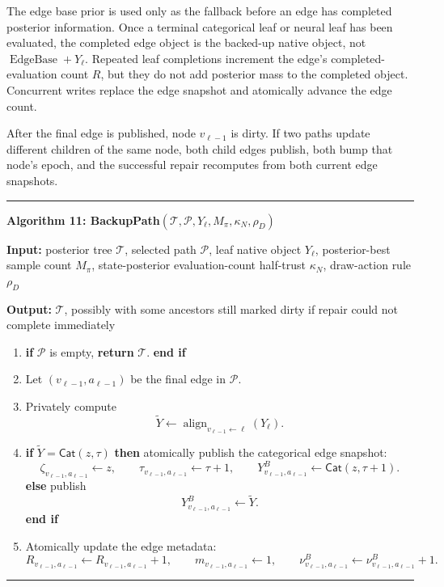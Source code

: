 \documentclass[11pt]{article}
\newcommand{\Tree}{\mathcal{T}}
\newcommand{\Path}{\mathcal{P}}
\newcommand{\Align}{\operatorname{align}}
\newcommand{\EdgeBase}{\operatorname{EdgeBase}}
\newcommand{\CatObj}{\mathsf{Cat}}
\newenvironment{algorithmblock}[1]
{
  \par\medskip
  \noindent\hrule\par\smallskip
  \noindent\textbf{#1}
  \par\smallskip
}
{
  \par\smallskip\noindent\hrule\par\medskip
}
\newcommand{\Input}{\textbf{Input: }}
\newcommand{\Output}{\textbf{Output: }}
\newcommand{\Return}{\textbf{return }}
\newcommand{\If}{\textbf{if }}
\newcommand{\Then}{\textbf{ then }}
\newcommand{\Else}{\textbf{else }}
\newcommand{\EndIf}{\textbf{end if}}
\begin{document}
The edge base prior is used only as the fallback before an edge has completed
posterior information. Once a terminal categorical leaf or neural leaf has been
evaluated, the completed edge object is the backed-up native object, not
\(\EdgeBase+Y_\ell\). Repeated leaf completions increment the edge's
completed-evaluation count \(R\), but they do not add posterior mass to the
completed object. Concurrent writes replace the edge snapshot and atomically
advance the edge count.

After the final edge is published, node \(v_{\ell-1}\) is dirty. If two paths
update different children of the same node, both child edges publish, both bump
that node's epoch, and the successful repair recomputes from both current edge
snapshots.

\begin{algorithmblock}{Algorithm 11: BackupPath\((\Tree,\Path,Y_\ell,M_\pi,\kappa_N,\rho_D)\)}

\Input posterior tree \(\Tree\), selected path \(\Path\), leaf native object \(Y_\ell\), posterior-best sample count \(M_\pi\), state-posterior evaluation-count half-trust \(\kappa_N\), draw-action rule \(\rho_D\)

\Output \(\Tree\), possibly with some ancestors still marked dirty if repair could not complete immediately

\begin{enumerate}[leftmargin=2em]
  \item \If \(\Path\) is empty, \Return \(\Tree\). \EndIf

  \item Let \((v_{\ell-1},a_{\ell-1})\) be the final edge in \(\Path\).

  \item Privately compute
  \[
  \tilde Y
  \gets
  \Align_{v_{\ell-1}\leftarrow \ell}(Y_\ell).
  \]

  \item \If \(\tilde Y=\CatObj(z,\tau)\) \Then atomically publish the categorical
  edge snapshot:
  \[
  \zeta_{v_{\ell-1},a_{\ell-1}}\gets z,
  \qquad
  \tau_{v_{\ell-1},a_{\ell-1}}\gets \tau+1,
  \qquad
  Y^B_{v_{\ell-1},a_{\ell-1}}\gets\CatObj(z,\tau+1).
  \]
  \Else publish
  \[
  Y^B_{v_{\ell-1},a_{\ell-1}}\gets\tilde Y.
  \]
  \EndIf

  \item Atomically update the edge metadata:
  \[
  R_{v_{\ell-1},a_{\ell-1}}
  \gets
  R_{v_{\ell-1},a_{\ell-1}}+1,
  \qquad
  m_{v_{\ell-1},a_{\ell-1}}\gets1,
  \qquad
  \nu^B_{v_{\ell-1},a_{\ell-1}}
  \gets
  \nu^B_{v_{\ell-1},a_{\ell-1}}+1.
  \]


\end{enumerate}
\end{algorithmblock}
\end{document}

